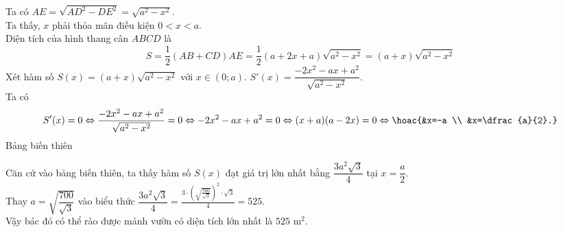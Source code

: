 \begin{bt}
{Ta có $A E=\sqrt{A D^2-D E^2}=\sqrt{a^2-x^2}$. \\
Ta thấy, $x$ phải thỏa mãn điều kiện $0<x<a$. \\
Diện tích của hình thang cân $A B C D$ là
$$
S=\dfrac{1}{2}(A B+C D) A E=\dfrac{1}{2}(a+2 x+a) \sqrt{a^2-x^2}=(a+x) \sqrt{a^2-x^2}
$$
Xét hàm số $S(x)=(a+x) \sqrt{a^2-x^2}$ với $x \in(0 ; a)$. $S'(x)=\dfrac{-2 x^2-a x+a^2}{\sqrt{a^2-x^2}}$. \\
Ta có 
$$S^{\prime}(x)=0 \Leftrightarrow \frac{-2 x^2-a x+a^2}{\sqrt{a^2-x^2}}=0 \Leftrightarrow-2 x^2-a x+a^2=0 \Leftrightarrow(x+a)(a-2 x)=0 \Leftrightarrow\hoac{&x=-a \\ &x=\dfrac{a}{2}.}$$
Bảng biến thiên
\begin{center}
\end{center}
Căn cứ vào bảng biến thiên, ta thấy hàm số $S(x)$ đạt giá trị lớn nhất bằng $\dfrac{3 a^2 \sqrt{3}}{4}$ tại $x=\dfrac{a}{2}$. \\
Thay $a=\sqrt{\dfrac{700}{\sqrt{3}}}$ vào biểu thức $\dfrac{3 a^2 \sqrt{3}}{4}=\tfrac{3 \cdot\left(\sqrt{\frac{700}{\sqrt{3}}}\right)^2 \cdot \sqrt{3}}{4}=525$.\\
Vậy bác đó có thể rào được mảnh vườn có diện tích lớn nhất là $525$ m$^2$.
}
\end{bt}


